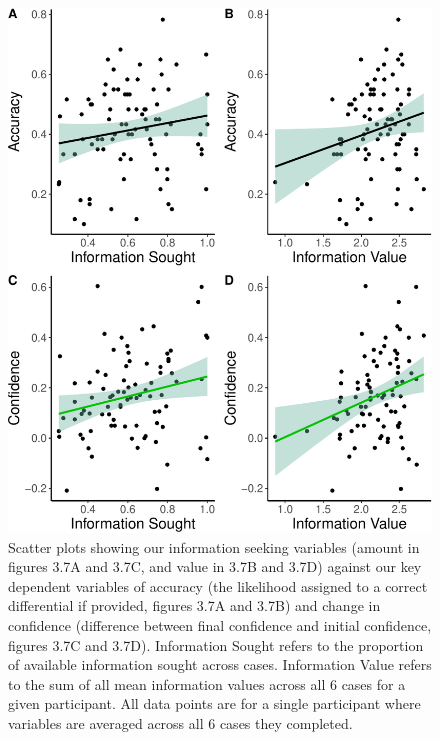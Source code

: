 \documentclass[a4paper, nobind]{templates/ociamthesis}
\begin{document}
\begin{figure}[H]

{\centering \includegraphics[width=1\linewidth]{_main_files/figure-latex/confAccPlot-1} 

}

\caption[Online Study: Information Seeking Plotted Against Confidence/Accuracy (Scatter Plots)]{Scatter plots showing our information seeking variables (amount in figures 3.7A and 3.7C, and value in 3.7B and 3.7D) against our key dependent variables of accuracy (the likelihood assigned to a correct differential if provided, figures 3.7A and 3.7B) and change in confidence (difference between final confidence and initial confidence, figures 3.7C and 3.7D). Information Sought refers to the proportion of available information sought across cases. Information Value refers to the sum of all mean information values across all 6 cases for a given participant. All data points are for a single participant where variables are averaged across all 6 cases they completed.}\label{fig:confAccPlot}
\end{figure}
\end{document}
